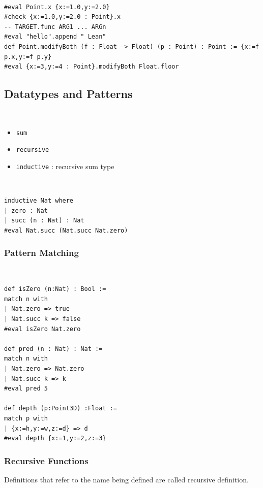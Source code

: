 \documentclass{article}
\begin{document}
\begin{definition}[accessor]~
    \begin{verbatim}
#eval Point.x {x:=1.0,y:=2.0}
#check {x:=1.0,y:=2.0 : Point}.x
-- TARGET.func ARG1 ... ARGn
#eval "hello".append " Lean"
def Point.modifyBoth (f : Float -> Float) (p : Point) : Point := {x:=f p.x,y:=f p.y}
#eval {x:=3,y:=4 : Point}.modifyBoth Float.floor
\end{verbatim}
\end{definition}

\subsection{Datatypes and Patterns}
\begin{definition}[datatype]~
    \begin{itemize}
        \item \verb|sum|
        \item \verb|recursive|
        \item \verb|inductive| : recursive sum type
    \end{itemize}
\end{definition}

\begin{example}[inductive]~
    \begin{verbatim}
inductive Nat where
| zero : Nat
| succ (n : Nat) : Nat
#eval Nat.succ (Nat.succ Nat.zero)
\end{verbatim}
\end{example}

\subsubsection{Pattern Matching}
\begin{definition}~
    \begin{verbatim}
def isZero (n:Nat) : Bool :=
match n with
| Nat.zero => true
| Nat.succ k => false
#eval isZero Nat.zero

def pred (n : Nat) : Nat :=
match n with
| Nat.zero => Nat.zero
| Nat.succ k => k
#eval pred 5

def depth (p:Point3D) :Float :=
match p with
| {x:=h,y:=w,z:=d} => d
#eval depth {x:=1,y:=2,z:=3}
\end{verbatim}
\end{definition}

\subsubsection{Recursive Functions}
\begin{definition}
    Definitions that refer to the name being defined are called recursive definition.
\end{definition}
\end{document}
